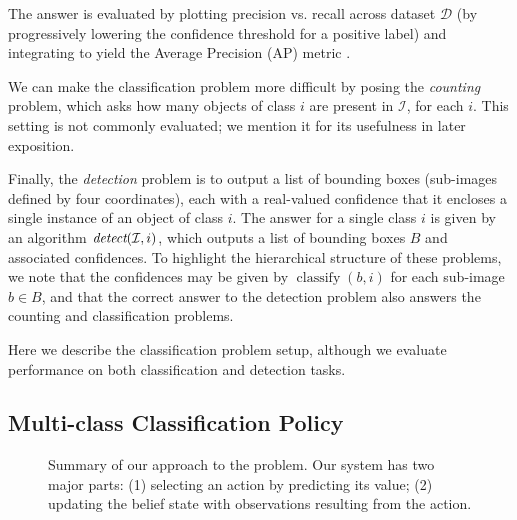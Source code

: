 \documentclass[runningheads]{llncs}
\begin{document}
The answer is evaluated by plotting precision vs. recall across dataset $\mathcal{D}$ (by progressively lowering the confidence threshold for a positive label) and integrating to yield the Average Precision (AP) metric \cite{pascal-voc-2010}.

We can make the classification problem more difficult by posing the \emph{counting} problem, which asks how many objects of class $i$ are present in $\mathcal{I}$, for each $i$.
This setting is not commonly evaluated; we mention it for its usefulness in later exposition.

Finally, the \emph{detection} problem is to output a list of bounding boxes (sub-images defined by four coordinates), each with a real-valued confidence that it encloses a single instance of an object of class $i$.
The answer for a single class $i$ is given by an algorithm $\emph{detect}(\mathcal{I},i)$, which outputs a list of bounding boxes $B$ and associated confidences.
To highlight the hierarchical structure of these problems, we note that the confidences may be given by $\operatorname{classify}(b,i)$ for each sub-image $b \in B$, and that the correct answer to the detection problem also answers the counting and classification problems.

Here we describe the classification problem setup, although we evaluate performance on both classification and detection tasks.

\subsection{Multi-class Classification Policy}

\begin{figure}[h!]
  \caption{Summary of our approach to the problem. Our system has two major parts: (1) selecting an action by predicting its value; (2) updating the belief state with observations resulting from the action.}
  \label{fig:evaluation}
\end{figure}
\end{document}
